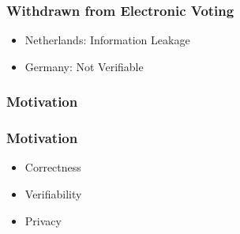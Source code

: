 \documentclass{beamer}
\begin{document}
\begin{frame}
\frametitle{Withdrawn from Electronic Voting}
\begin{itemize}
\item Netherlands: Information Leakage
\item Germany: Not Verifiable
\end{itemize}
\end{frame}


\begin{frame}
\frametitle{Motivation}
\begin{center}
\end{center}
\end{frame}

\begin{frame}
\frametitle{Motivation}
\begin{itemize}
\item Correctness
\item Verifiability
\item Privacy
\end{itemize}
\end{frame}
\end{document}

